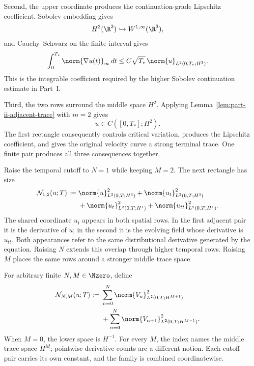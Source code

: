 Second, the upper coordinate produces the continuation-grade Lipschitz
coefficient.  Sobolev embedding gives
\begin{equation*}
 H^3(\R^3)\hookrightarrow W^{1,\infty}(\R^3),
\end{equation*}
and Cauchy--Schwarz on the finite interval gives
\begin{equation*}
 \int_0^{T_*}\norm{\nabla u(t)}_\infty\,dt
 \le C\sqrt{T_*}\,
 \norm{u}_{L^2(0,T_*;H^3)}.
\end{equation*}
This is the integrable coefficient required by the higher Sobolev continuation
estimate in Part~I.

Third, the two rows surround the middle space \(H^2\).  Applying
Lemma~\ref{lem:part-ii-adjacent-trace} with \(m=2\) gives
\begin{equation*}
 u\in C([0,T_*];H^2).
\end{equation*}
The first rectangle consequently controls critical variation, produces the
Lipschitz coefficient, and gives the original velocity curve a strong terminal
trace.  One finite pair produces all three consequences together.

Raise the temporal cutoff to \(N=1\) while keeping \(M=2\).  The next
rectangle has size
\begin{equation*}
\begin{aligned}
 \mathcal N_{1,2}(u;T)
 :={}&\norm{u}_{L^2(0,T;H^3)}^2
     +\norm{u_t}_{L^2(0,T;H^3)}^2
 \\
 &+\norm{u_t}_{L^2(0,T;H^1)}^2
     +\norm{u_{tt}}_{L^2(0,T;H^1)}^2.
\end{aligned}
\end{equation*}
The shared coordinate \(u_t\) appears in both spatial rows.  In the first
adjacent pair it is the derivative of \(u\); in the second it is the evolving
field whose derivative is \(u_{tt}\).  Both appearances refer to the same
distributional derivative generated by the equation.  Raising \(N\) extends
this overlap through higher temporal rows.  Raising \(M\) places the same
rows around a stronger middle trace space.

For arbitrary finite \(N,M\in\Nzero\), define
\begin{equation}
\begin{aligned}
 \mathcal N_{N,M}(u;T)
 :={}&\sum_{n=0}^N
 \norm{V_n}_{L^2(0,T;H^{M+1})}^2
 \\
 &+\sum_{n=0}^N
 \norm{V_{n+1}}_{L^2(0,T;H^{M-1})}^2.
\end{aligned}
\label{eq:rectangle-norm}
\end{equation}
When \(M=0\), the lower space is \(H^{-1}\).  For every \(M\), the index
names the middle trace space \(H^M\); pointwise derivative counts are a
different notion.  Each cutoff pair carries its own constant, and the family
is combined coordinatewise.

